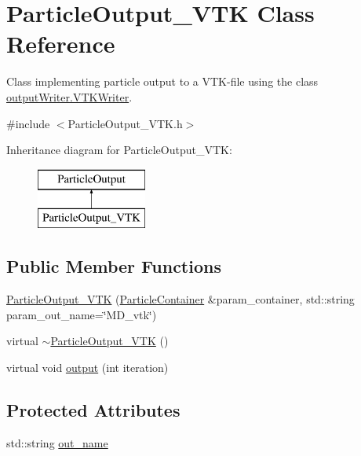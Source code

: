 \hypertarget{classParticleOutput__VTK}{\section{Particle\-Output\-\_\-\-V\-T\-K Class Reference}
\label{classParticleOutput__VTK}
}


Class implementing particle output to a V\-T\-K-\/file using the class \hyperlink{classoutputWriter_1_1VTKWriter}{output\-Writer.\-V\-T\-K\-Writer}.  




{\ttfamily \#include $<$Particle\-Output\-\_\-\-V\-T\-K.\-h$>$}

Inheritance diagram for Particle\-Output\-\_\-\-V\-T\-K\-:\begin{figure}[H]
\begin{center}
\leavevmode
\includegraphics[height=2.000000cm]{classParticleOutput__VTK}
\end{center}
\end{figure}
\subsection*{Public Member Functions}
\begin{DoxyCompactItemize}
\item 
\hyperlink{classParticleOutput__VTK_a0df82cb2d0314a7438d65950ecd0735e}{Particle\-Output\-\_\-\-V\-T\-K} (\hyperlink{classParticleContainer}{Particle\-Container} \&param\-\_\-container, std\-::string param\-\_\-out\-\_\-name=\char`\"{}M\-D\-\_\-vtk\char`\"{})
\item 
virtual \hyperlink{classParticleOutput__VTK_a37f5228beb2e63493f11e65fcbf76e15}{$\sim$\-Particle\-Output\-\_\-\-V\-T\-K} ()
\item 
virtual void \hyperlink{classParticleOutput__VTK_a56219fd326e37e78eff344765552a29a}{output} (int iteration)
\end{DoxyCompactItemize}
\subsection*{Protected Attributes}
\begin{DoxyCompactItemize}
\item 
std\-::string \hyperlink{classParticleOutput__VTK_adc267fd615815b1818fd0802f43819c5}{out\-\_\-name}
\end{DoxyCompactItemize}


